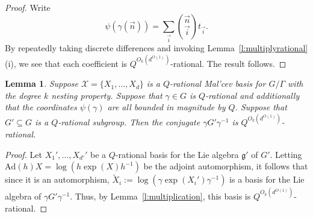 \documentclass[11pt, a4paper]{amsart}
\theoremstyle{plain}
\theoremstyle{plain}
\newtheorem{lemma}{Lemma}
\theoremstyle{definition}
\theoremstyle{remark}
\numberwithin{equation}{section}
\numberwithin{lemma}{section}
\numberwithin{proposition}{section}
\numberwithin{corollary}{section}
\numberwithin{definition}{section}
\numberwithin{claim}{section}
\begin{document}
\begin{proof}
Write
$$\psi(\gamma(\vec{n})) = \sum_{\vec{i}} \binom{\vec{n}}{\vec{i}} t_{\vec{i}}.$$
By repeatedly taking discrete differences and invoking Lemma~\ref{l:multiplyrational}(i), we see that each coefficient is $Q^{O_k(d^{O(1)})}$-rational. The result follows.
\end{proof}

\begin{lemma}
Suppose $\mathcal{X} = \{X_1, \dots, X_d\}$ is a $Q$-rational Mal'cev basis for $G/\Gamma$ with the degree $k$ nesting property. Suppose that $\gamma \in G$ is $Q$-rational and additionally that the coordinates $\psi(\gamma)$ are all bounded in magnitude by $Q$. Suppose that $G' \subseteq G$ is a $Q$-rational subgroup. Then the conjugate $\gamma G' \gamma^{-1}$ is $Q^{O_k(d^{O(1)})}$-rational.
\end{lemma}

\begin{proof}
Let $X_1', \dots, X_{d'}'$ be a $Q$-rational basis for the Lie algebra $\mathfrak{g}'$ of $G'$. Letting $\text{Ad}(h)X = \log(h \exp(X) h^{-1})$ be the adjoint automorphism, it follows that since it is an automorphism, $\tilde{X}_i:= \log(\gamma \exp(X_i') \gamma^{-1})$ is a basis for the Lie algebra of $\gamma G' \gamma^{-1}$. Thus, by Lemma~\ref{l:multiplication}, this basis is $Q^{O_k(d^{O(1)})}$-rational.
\end{proof}



\end{document}
